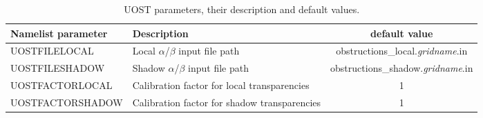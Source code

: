 \begin{table} \begin{center}
\begin{tabular}{|l|p{4cm}|c|} \hline \hline
Namelist parameter    &  Description           & default value \\
\hline
  UOSTFILELOCAL &  Local $\alpha$/$\beta$ input file path   &  obstructions\_local.\textit{gridname}.in    \\ \hline
  UOSTFILESHADOW &  Shadow $\alpha$/$\beta$ input file path   & obstructions\_shadow.\textit{gridname}.in   \\ \hline
  UOSTFACTORLOCAL &  Calibration factor for local transparencies  &  1   \\ \hline
  UOSTFACTORSHADOW &  Calibration factor for shadow transparencies  &  1  \\
\hline
\end{tabular} \end{center}
\caption{UOST parameters, their description and default values. } \label{tab:UOST}
\botline
\end{table}

